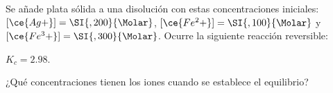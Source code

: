 Se añade plata sólida a una disolución con estas concentraciones iniciales: $[\ce{Ag+}]=\SI{,200}{\Molar}$, $[\ce{Fe^2+}]=\SI{,100}{\Molar}$ y $[\ce{Fe^3+}]=\SI{,300}{\Molar}$. Ocurre la siguiente reacción reversible:
\begin{center}
	 \quad$K_c=\num{2,98}$.
\end{center}
¿Qué concentraciones tienen los iones cuando se establece el equilibrio?
